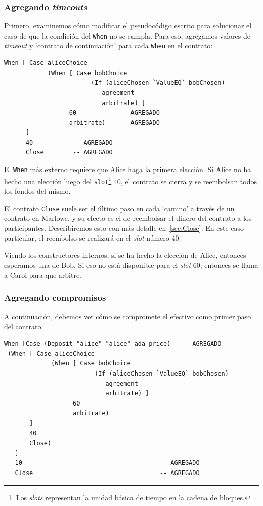 \documentclass[12pt]{book}
\begin{document}
\subsubsection{Agregando \textit{timeouts}}

Primero, examinemos cómo modificar el pseudocódigo escrito para solucionar el caso de que la condición del \texttt{When} no se cumpla. Para eso, agregamos valores de \textit{timeout} y `contrato de continuación' para cada \texttt{When} en el contrato:

\begin{lstlisting}[style=Haskell-cardano, language=Marlowe, caption=Pseudocódigo con timeouts.]
When [ Case aliceChoice
            (When [ Case bobChoice
                        (If (aliceChosen `ValueEQ` bobChosen)
                           agreement
                           arbitrate) ]
                  60            -- AGREGADO
                  arbitrate)    -- AGREGADO
      ]
      40           -- AGREGADO
      Close        -- AGREGADO
\end{lstlisting}

El \texttt{When} más externo requiere que Alice haga la primera elección. Si Alice no ha hecho una elección luego del \texttt{slot}\footnote{Los \textit{slots} representan la unidad básica de tiempo en la cadena de bloques.} 40, el contrato se cierra y se reembolsan todos los fondos del mismo.

El contrato \texttt{Close} suele ser el último paso en cada `camino' a través de un contrato en Marlowe, y su efecto es el de reembolsar el dinero del contrato a los participantes. Describiremos esto con más detalle en~\ref{sec:Close}. En este caso particular, el reembolso se realizará en el \textit{slot} número 40.

Viendo los constructores internos, si se ha hecho la elección de Alice, entonces esperamos una de Bob. Si eso no está disponible para el \textit{slot} 60, entonces se llama a Carol para que arbitre. 


\subsubsection{Agregando compromisos}

A continuación, debemos ver cómo se compromete el efectivo como primer paso del contrato.

\begin{minipage}{\linewidth}
\begin{lstlisting}[style=Haskell-cardano, language=Marlowe, caption=Pseudocódigo con validación de fondos.]
When [Case (Deposit "alice" "alice" ada price)   -- AGREGADO
 (When [ Case aliceChoice
             (When [ Case bobChoice
                         (If (aliceChosen `ValueEQ` bobChosen)
                            agreement
                            arbitrate) ]
                   60
                   arbitrate)
       ]
       40
       Close)
   ]
   10                                      -- AGREGADO
   Close                                   -- AGREGADO
\end{lstlisting}
\end{minipage}
\end{document}
